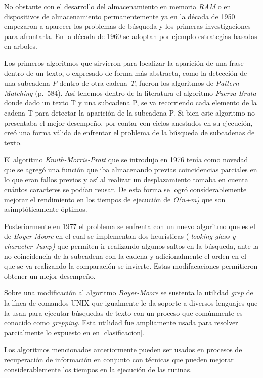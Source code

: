 \documentclass[
  10,
  openany]{book}
\begin{document}
No obstante con el desarrollo del almacenamiento en memoria \emph{RAM} o en dispositivos de almacenamiento permanentemente ya en la década de 1950 empezaron a aparecer los problemas de búsqueda y los primeras investigaciones para afrontarla. En la década de 1960 se adoptan por ejemplo estrategias basadas en arboles.

Los primeros algoritmos que sirvieron para localizar la aparición de una frase dentro de un texto, o expresado de forma más abstracta, como la detección de una subcadena \emph{P} dentro de otra cadena \emph{T}, fueron los algoritmos de \emph{Pattern-Matching} \citep{goodrich2013} (p.~584). Así tenemos dentro de la literatura el algoritmo \emph{Fuerza Bruta} donde dado un texto T y una subcadena P, se va recorriendo cada elemento de la cadena T para detectar la aparición de la subcadena P. Si bien este algoritmo no presentaba el mejor desempeño, por contar con ciclos anestados en su ejecución, creó una forma válida de enfrentar el problema de la búsqueda de subcadenas de texto.

El algoritmo \emph{Knuth-Morris-Pratt} que se introdujo en 1976 tenía como novedad que se agregó una función que iba almacenando previas coincidencias parciales en lo que eran fallos previos y así al realizar un desplazamiento tomaba en cuenta cuántos caracteres se podían reusar. De esta forma se logró considerablemente mejorar el rendimiento en los tiempos de ejecución de \emph{O(n+m)} que son asimptóticamente óptimos.

Posteriormente en 1977 el problema se enfrenta con un nuevo algoritmo que es el de \emph{Boyer-Moore} en el cual se implementan dos heurísticas ( \emph{looking-glass y} \emph{character-Jump)} que permiten ir realizando algunos saltos en la búsqueda, ante la no coincidencia de la subcadena con la cadena y adicionalmente el orden en el que se va realizando la comparación se invierte. Estas modifacaciones permitieron obtener un mejor desempeño.

Sobre una modificación al algoritmo \emph{Boyer-Moore} se sustenta la utilidad \emph{grep} de la línea de comandos UNIX que igualmente le da soporte a diversos lenguajes que la usan para ejecutar búsquedas de texto con un proceso que comúnmente es conocido como \emph{grepping}. Esta utilidad fue ampliamente usada para resolver parcialmente lo expuesto en en \ref{clasificacion}.

Los algoritmos mencionados anteriormente pueden ser usados en procesos de recuperación de información en conjunto con técnicas que pueden mejorar considerablemente los tiempos en la ejecución de las rutinas.
\end{document}
